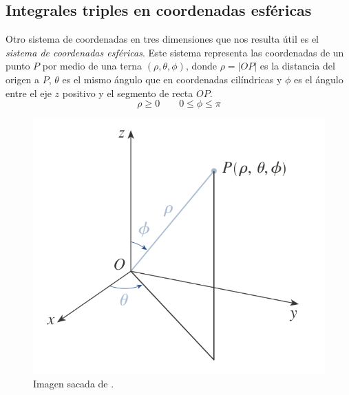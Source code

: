 \documentclass[12pt]{article}
\begin{document}
\subsection{Integrales triples en coordenadas esféricas}
Otro sistema de coordenadas en tres dimensiones que nos resulta útil es el \textit{sistema de coordenadas esféricas}. Este sistema representa las coordenadas de un punto $ P $ por medio de una terna $ (\rho,\theta,\phi) $, donde $ \rho=\left|OP\right| $ es la distancia del origen a $ P $, $ \theta $ es el mismo ángulo que en coordenadas cilíndricas y $ \phi $ es el ángulo entre el eje $ z $ positivo y el segmento de recta $ OP $.
\[
  \rho\geq 0\qquad 0\leq \phi\leq \pi
\]

\begin{figure}[H]
  \centering
  \begin{minipage}{0.45\textwidth}
	\centering
	\includegraphics[width=\linewidth]{imagenes/coord-esfericas.png}
	\caption{Imagen sacada de \parencite{stewart2}.}
	\label{fig:coord-esfericas}
  \end{minipage}
  \begin{minipage}{0.45\textwidth}
	\centering

\end{minipage}
\end{figure}
\end{document}
